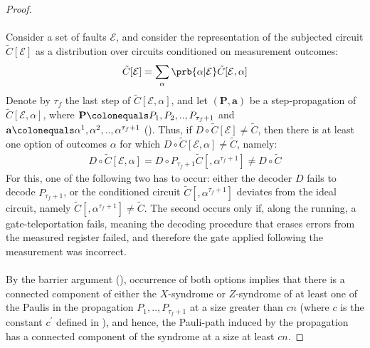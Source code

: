 \begin{proof}
    \paragraph{} 
    Consider a set of faults $\mathcal{E}$, and consider the representation of the subjected circuit $\tilde{C}[\mathcal{E}]$ as a distribution over circuits conditioned on measurement outcomes:
    \begin{equation*}
      \begin{split}
        \tilde{C}[\mathcal{E}] = \sum_{\alpha} \prb{\alpha | \mathcal{E} }\tilde{C}[\mathcal{E}, \alpha] 
      \end{split}
    \end{equation*}
    Denote by $\tau_{f}$ the last step of $\tilde{C}[\mathcal{E},\alpha]$, and let $(\mathbf{P},\mathbf{a}) $ be a step-propagation of $\tilde{C}[\mathcal{E},\alpha]$, where $\mathbf{P} \colonequals  P_{1},P_{2},..,P_{\tau_{f}+1}$ and $\mathbf{a} \colonequals \alpha^{1}, \alpha^{2},..,\alpha^{\tau_{f}+1}$ (). Thus, if $D \circ \tilde{C}[\mathcal{E}] \neq \tilde{C}$, then there is at least one option of outcomes $\alpha$ for which $D \circ \tilde{C}[\mathcal{E},\alpha] \neq \tilde{C}$, namely: 
    \begin{equation*}
      \begin{split}
        D \circ \tilde{C}[\mathcal{E},\alpha] = D\circ P_{\tau_{f}+1} \tilde{C}[,\alpha^{\tau_{f}+1}]  \neq D \circ \tilde{C}
      \end{split}
    \end{equation*} 
    For this, one of the following two has to occur: either the decoder $D$ fails to decode $P_{\tau_{f}+1}$, or the conditioned circuit $\tilde{C}[,\alpha^{\tau_{f}+1}]$ deviates from the ideal circuit, namely $\tilde{C}[,\alpha^{\tau_{f}+1}] \neq \tilde{C}$. The second occurs only if, along the running, a gate-teleportation fails, meaning the decoding procedure that erases errors from the measured register failed, and therefore the gate applied following the measurement was incorrect. 

    \paragraph{} 

By the barrier argument (), occurrence of both options implies that there is a connected component of either the $X$-syndrome or $Z$-syndrome of at least one of the Paulis in the propagation $P_{1},..,P_{\tau_{f}+1}$ at a size greater than $cn$ (where $c$ is the constant $c^{\prime}$ defined in ), and hence, the Pauli-path induced by the propagation has a connected component of the syndrome at a size at least $cn$.


\end{proof}
